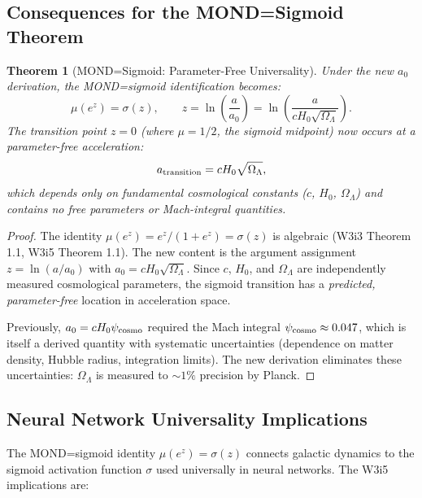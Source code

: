 \documentclass[11pt]{article}
\newtheorem{theorem}{Theorem}[section]
\theoremstyle{definition}
\theoremstyle{remark}
\newcommand{\mufd}{\mu}
\begin{document}
\subsection{Consequences for the MOND=Sigmoid Theorem}
\label{sec:sigmoid-consequences}

\begin{theorem}[MOND=Sigmoid: Parameter-Free Universality]
\label{thm:sigmoid-parameter-free}
Under the new $a_0$ derivation, the MOND=sigmoid identification becomes:
\begin{equation}
  \mufd(e^z) = \sigma(z), \qquad z = \ln\!\left(\frac{a}{a_0}\right)
  = \ln\!\left(\frac{a}{cH_0\sqrt{\Omega_\Lambda}}\right).
  \label{eq:sigmoid-new}
\end{equation}
The transition point $z = 0$ (where $\mufd = 1/2$, the sigmoid
midpoint) now occurs at a \emph{parameter-free} acceleration:
\begin{equation}
  a_{\rm transition} = cH_0\sqrt{\Omega_\Lambda},
  \label{eq:a-transition}
\end{equation}
which depends only on fundamental cosmological constants ($c$, $H_0$,
$\Omega_\Lambda$) and contains no free parameters or Mach-integral
quantities.
\end{theorem}

\begin{proof}
The identity $\mufd(e^z) = e^z/(1+e^z) = \sigma(z)$ is algebraic
(W3i3 Theorem 1.1, W3i5 Theorem 1.1).  The new content is the
argument assignment $z = \ln(a/a_0)$ with
$a_0 = cH_0\sqrt{\Omega_\Lambda}$.  Since $c$, $H_0$, and
$\Omega_\Lambda$ are independently measured cosmological parameters,
the sigmoid transition has a \emph{predicted, parameter-free} location
in acceleration space.

Previously, $a_0 = cH_0\psi_{\rm cosmo}$ required the Mach integral
$\psi_{\rm cosmo} \approx 0.047$, which is itself a derived quantity
with systematic uncertainties (dependence on matter density, Hubble
radius, integration limits).  The new derivation eliminates these
uncertainties: $\Omega_\Lambda$ is measured to $\sim 1\%$ precision
by Planck.
\end{proof}

\subsection{Neural Network Universality Implications}
\label{sec:nn-universality}

The MOND=sigmoid identity $\mufd(e^z) = \sigma(z)$ connects
galactic dynamics to the sigmoid activation function $\sigma$ used
universally in neural networks.  The W3i5 implications are:
\end{document}
